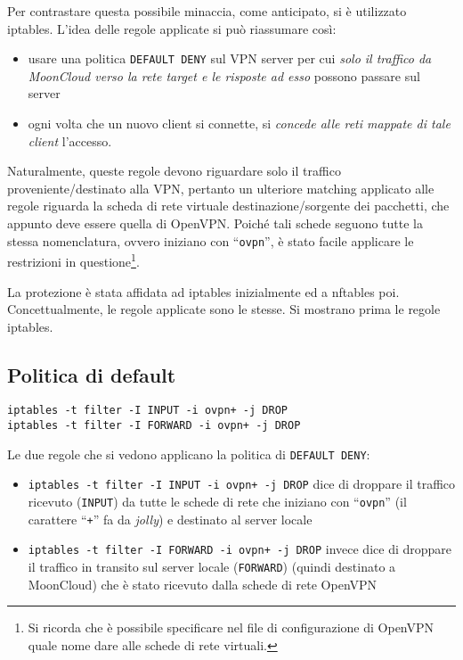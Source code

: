  
Per contrastare questa possibile minaccia, come anticipato, si è utilizzato iptables.
L'idea delle regole applicate si può riassumare così:
\begin{itemize}
	\item usare una politica \texttt{DEFAULT DENY} sul VPN server per cui \textit{solo
		il traffico da MoonCloud verso la rete target e le risposte ad esso} possono passare sul server
		\item ogni volta che un nuovo client si connette, si \textit{concede alle reti
			mappate di tale client} l'accesso.
\end{itemize}
		
Naturalmente, queste regole devono riguardare solo il traffico proveniente/destinato
alla VPN, pertanto un ulteriore matching applicato alle regole riguarda la scheda di
rete virtuale destinazione/sorgente dei pacchetti, che appunto deve essere quella
di OpenVPN. Poiché tali schede seguono tutte la stessa nomenclatura, ovvero iniziano con
``\texttt{ovpn}'', è stato facile applicare le restrizioni in questione\footnote{Si ricorda che
è possibile specificare nel file di configurazione di OpenVPN quale nome dare alle schede di rete
virtuali.}.

La protezione è stata affidata ad iptables inizialmente ed a nftables poi. Concettualmente,
le regole applicate sono le stesse. Si mostrano prima le regole iptables.
		
\subsection{Politica di default}
		
\begin{verbatim}
iptables -t filter -I INPUT -i ovpn+ -j DROP
iptables -t filter -I FORWARD -i ovpn+ -j DROP
\end{verbatim}
		
		Le due regole che si vedono applicano la politica di \texttt{DEFAULT DENY}:
		\begin{itemize}
			\item \texttt{iptables -t filter -I INPUT -i ovpn+ -j DROP} dice di droppare
			      il traffico ricevuto (\texttt{INPUT})
			      da tutte le schede di rete che iniziano con ``\texttt{ovpn}''
			      (il carattere ``\texttt{+}'' fa da \textit{jolly}) e destinato al server locale
			\item \texttt{iptables -t filter -I FORWARD -i ovpn+ -j DROP} invece dice
			      di droppare il traffico in transito sul server locale (\texttt{FORWARD}) (quindi
			      destinato a MoonCloud)
			      che è stato ricevuto dalla schede di rete OpenVPN
		\end{itemize}
		
